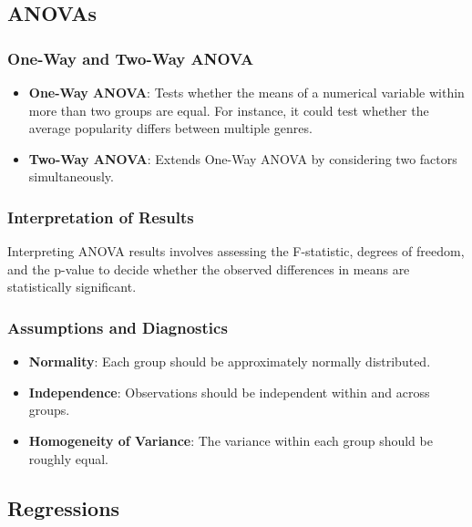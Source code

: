 \documentclass[
  b5paper]{book}
\providecommand{\tightlist}{%
  \setlength{\itemsep}{0pt}\setlength{\parskip}{0pt}}
\begin{document}
\hypertarget{anovas}{%
\subsection{ANOVAs}\label{anovas}}

\hypertarget{one-way-and-two-way-anova}{%
\subsubsection{One-Way and Two-Way ANOVA}\label{one-way-and-two-way-anova}}

\begin{itemize}
\item
  \textbf{One-Way ANOVA}: Tests whether the means of a numerical variable within more than two groups are equal. For instance, it could test whether the average popularity differs between multiple genres.
\item
  \textbf{Two-Way ANOVA}: Extends One-Way ANOVA by considering two factors simultaneously.
\end{itemize}

\hypertarget{interpretation-of-results}{%
\subsubsection{Interpretation of Results}\label{interpretation-of-results}}

Interpreting ANOVA results involves assessing the F-statistic, degrees of freedom, and the p-value to decide whether the observed differences in means are statistically significant.

\hypertarget{assumptions-and-diagnostics}{%
\subsubsection{Assumptions and Diagnostics}\label{assumptions-and-diagnostics}}

\begin{itemize}
\tightlist
\item
  \textbf{Normality}: Each group should be approximately normally distributed.
\item
  \textbf{Independence}: Observations should be independent within and across groups.
\item
  \textbf{Homogeneity of Variance}: The variance within each group should be roughly equal.
\end{itemize}

\hypertarget{regressions}{%
\subsection{Regressions}\label{regressions}}
\end{document}
